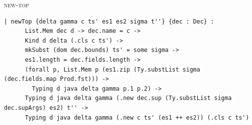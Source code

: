 \begin{cmp}{\textsc{new-top}}
\begin{paperside}
\end{paperside}
\begin{leanside}
\begin{lstlisting}[style=leanside]
  | newTop {delta gamma c ts' es1 es2 sigma t''} {dec : Dec} :
      List.Mem dec d -> dec.name = c ->
      Kind d delta (.cls c ts') ->
      mkSubst (dom dec.bounds) ts' = some sigma ->
      es1.length = dec.fields.length ->
      (forall p, List.Mem p (es1.zip (Ty.substList sigma (dec.fields.map Prod.fst))) ->
        Typing d java delta gamma p.1 p.2) ->
      Typing d java delta gamma (.new dec.sup (Ty.substList sigma dec.supArgs) es2) t'' ->
      Typing d java delta gamma (.new c ts' (es1 ++ es2)) (.cls c ts')
\end{lstlisting}
\end{leanside}
\end{cmp}


